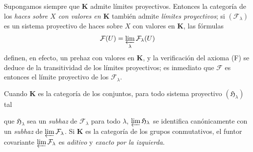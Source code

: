 \begin{env}[3.2.6]
\label{0.3.2.6-fr}
Supongamos siempre que $\boldsymbol{K}$ admite límites proyectivos. Entonces la
categoría de los \emph{haces sobre $X$ con valores en $\boldsymbol{K}$} también admite
\emph{límites proyectivos}; si $(\mathcal{F}_\lambda)$ es un sistema
proyectivo de haces sobre $X$ con valores en $\boldsymbol{K}$, las fórmulas
\[
  \mathcal{F}(U)=\varprojlim_\lambda\mathcal{F}_\lambda(U)
\]
definen, en efecto, un prehaz con valores en $\boldsymbol{K}$, y la
verificación del axioma (F) se deduce de la transitividad de los límites
proyectivos; es inmediato que $\mathcal{F}$ es entonces el límite proyectivo
de los $\mathcal{F}_\lambda$.

Cuando $\boldsymbol{K}$ es la categoría de los conjuntos, para todo sistema
proyectivo $(\mathfrak{H}_\lambda)$ tal


que $\mathfrak{H}_\lambda$ sea un \emph{subhaz} de
$\mathcal{F}_\lambda$ para todo $\lambda$,
$\varprojlim\mathfrak{H}_\lambda$ se identifica canónicamente con un
\emph{subhaz} de $\varprojlim\mathcal{F}_\lambda$. Si
$\boldsymbol{K}$ es la categoría de los grupos conmutativos, el funtor covariante
$\varprojlim\mathcal{F}_\lambda$ es \emph{aditivo} y \emph{exacto por la izquierda}.
\end{env}
